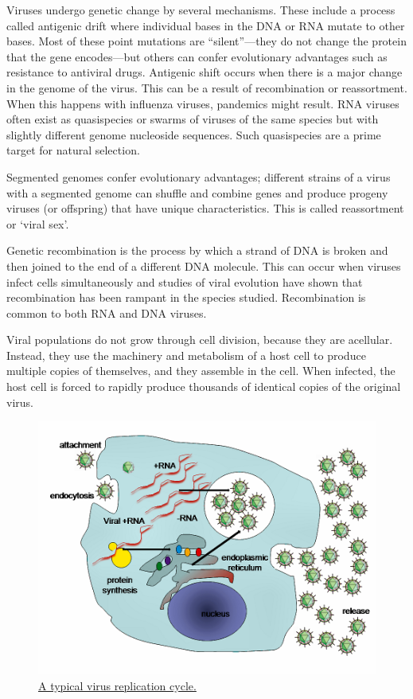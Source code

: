 Viruses undergo genetic change by several mechanisms. These include a process called antigenic drift where individual bases in the DNA or RNA mutate to other bases. Most of these point mutations are ``silent''---they do not change the protein that the gene encodes---but others can confer evolutionary advantages such as resistance to antiviral drugs. Antigenic shift occurs when there is a major change in the genome of the virus. This can be a result of recombination or reassortment. When this happens with influenza viruses, pandemics might result. RNA viruses often exist as quasispecies or swarms of viruses of the same species but with slightly different genome nucleoside sequences. Such quasispecies are a prime target for natural selection.

Segmented genomes confer evolutionary advantages; different strains of a virus with a segmented genome can shuffle and combine genes and produce progeny viruses (or offspring) that have unique characteristics. This is called reassortment or `viral sex'.

Genetic recombination is the process by which a strand of DNA is broken and then joined to the end of a different DNA molecule. This can occur when viruses infect cells simultaneously and studies of viral evolution have shown that recombination has been rampant in the species studied. Recombination is common to both RNA and DNA viruses.

Viral populations do not grow through cell division, because they are acellular. Instead, they use the machinery and metabolism of a host cell to produce multiple copies of themselves, and they assemble in the cell. When infected, the host cell is forced to rapidly produce thousands of identical copies of the original virus.



\begin{figure}

{\centering \includegraphics[width=0.7\linewidth]{./figures/bacteria/HepC_replication} 

}

\caption{\href{https://commons.wikimedia.org/wiki/File:HepC_replication.png}{A typical virus replication cycle.}}\label{fig:virusrepc}
\end{figure}

